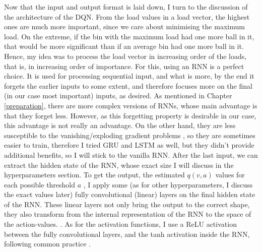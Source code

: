Now that the input and output format is laid down, I turn to the discussion of the architecture of the DQN. From the load values in a load vector, the highest ones are much more important, since we care about minimising the maximum load. On the extreme, if the bin with the maximum load had one more ball in it, that would be more significant than if an average bin had one more ball in it. Hence, my idea was to process the load vector in increasing order of the loads, that is, in increasing order of importance. For this, using an RNN is a perfect choice. It is used for processing sequential input, and what is more, by the end it forgets the earlier inputs to some extent, and therefore focuses more on the final (in our case most important) inputs, as desired. As mentioned in Chapter \ref{preparation}, there are more complex versions of RNNs, whose main advantage is that they forget less. However, as this forgetting property is desirable in our case, this advantage is not really an advantage. On the other hand, they are less susceptible to the vanishing/exploding gradient problems \cite{noh2021rnnvanishinggradient}, so they are sometimes easier to train, therefore I tried GRU and LSTM as well, but they didn't provide additional benefits, so I will stick to the vanilla RNN. After the last input, we can extract the hidden state of the RNN, whose exact size I will discuss in the hyperparameters section. To get the output, the estimated $q(v,a)$ values for each possible threshold $a$ , I apply some (as for other hyperparameters, I discuss the exact values later) fully convolutional (linear) layers on the final hidden state of the RNN. These linear layers not only bring the output to the correct shape, they also transform from the internal representation of the RNN to the space of the action-values. . As for the activation functions, I use a ReLU activation between the fully convolutional layers, and the tanh activation inside the RNN, following common practice \cite{szandala2020activationfunctions}.


